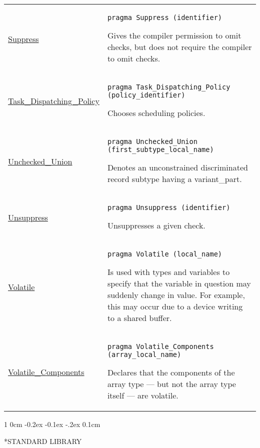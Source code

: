 \documentclass[english]{article}
\makeatletter
\renewcommand\section{%
   \@startsection{section}%
   {1}%
   {0cm}%
   {-0.2ex \@plus -0.1ex \@minus -.2ex}%
   {0.1cm}%
{\raggedright\normalfont\normalsize\bfseries}%
}
\makeatother
\begin{document}
\begin{scriptsize}
\begin{multicols*}{3}
\begin{tabular}{@{}p{2cm}p{6.5cm}}
\href{http://www.ada-auth.org/standards/22rm/html/RM-11-5.html}{Suppress} & \texttt{pragma Suppress (identifier)}

Gives the compiler permission to omit checks, but does not require the compiler to omit checks.\\

\href{http://www.ada-auth.org/standards/22rm/html/RM-D-2-2.html}{Task\_Dispatching\_Policy} & \texttt{pragma Task\_Dispatching\_Policy (policy\_identifier)}

Chooses scheduling policies.\\

\href{http://www.ada-auth.org/standards/22rm/html/RM-J-15-6.html}{Unchecked\_Union} & \texttt{pragma Unchecked\_Union (first\_subtype\_local\_name)}

Denotes an unconstrained discriminated record subtype having a variant\_part.\\

\href{http://www.ada-auth.org/standards/22rm/html/RM-11-5.html}{Unsuppress} & \texttt{pragma Unsuppress (identifier)}

Unsuppresses a given check.\\

\href{http://www.ada-auth.org/standards/22rm/html/RM-J-15-8.html}{Volatile} & \texttt{pragma Volatile (local\_name)}

Is used with types and variables to specify that the variable in question may suddenly change in value. For example, this may occur due to a device writing to a shared buffer.\\

\href{http://www.ada-auth.org/standards/22rm/html/RM-J-15-8.html}{Volatile\_Components} & \texttt{pragma Volatile\_Components (array\_local\_name)}

Declares that the components of the array type — but not the array type itself — are volatile.\\

\end{tabular}
\end{multicols*}
\clearpage
\begin{multicols*}{5}
\section*{STANDARD LIBRARY}


\end{multicols*}
\end{scriptsize}
\end{document}
